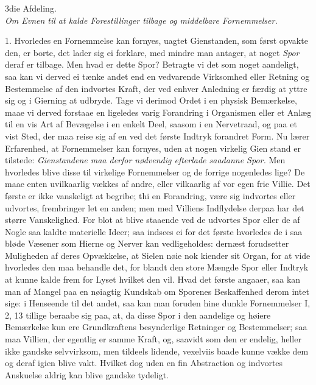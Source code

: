 \documentclass[12pt,a4paper]{article}
\newcommand{\afdeling}[2]{%
  \medskip\begin{center}{\large #1}\\[4pt]{\emph{#2}}\end{center}\smallskip}
\newcommand{\opage}[1]{\marginnote{\footnotesize\textit{[#1]}}}
\begin{document}
\afdeling{3die Afdeling.}{Om Evnen til at kalde Forestillinger tilbage og middelbare
Fornemmelser.}

1. Hvorledes en Fornemmelse kan fornyes, uagtet Gienstanden, som først opvakte den, er
borte, det lader sig ei forklare, med mindre man antager, at noget \emph{Spor} deraf er
tilbage. Men hvad er dette Spor? Betragte vi det som noget aandeligt, saa kan vi derved
ei tænke andet end en vedvarende Virksomhed eller Retning og Bestemmelse af den
indvortes Kraft, der ved enhver Anledning er færdig at yttre sig og i Gierning at
udbryde. Tage vi derimod Ordet i en physisk Bemærkelse, maae vi derved forstaae en
ligeledes varig Forandring i Organismen eller et Anlæg til en vis Art af Bevægelse i en
enkelt Deel, saasom i en Nervetraad, og paa et vist Sted, der maa reise sig af en ved
det første Indtryk forandret Form. Nu lærer Erfarenhed, at Fornemmelser kan fornyes,
uden at nogen virkelig Gien%
\opage{91}stand er tilstede: \emph{Gienstandene maa derfor nødvendig efterlade saadanne Spor.} Men
hvorledes blive disse til virkelige Fornemmelser og de forrige nogenledes lige? De maae
enten uvilkaarlig vækkes af andre, eller vilkaarlig af vor egen frie Villie. Det første
er ikke vanskeligt at begribe; thi en Forandring, være sig indvortes eller udvortes,
frembringer let en anden; men med Villiens Indflydelse derpaa har det større
Vanskelighed. For blot at blive staaende ved de udvortes Spor eller de af Nogle saa
kaldte materielle Ideer; saa indsees ei for det første hvorledes de i saa bløde Væsener
som Hierne og Nerver kan vedligeholdes: dernæst forudsetter Muligheden af deres
Opvækkelse, at Sielen nøie nok kiender sit Organ, for at vide hvorledes den maa behandle
det, for blandt den store Mængde Spor eller Indtryk at kunne kalde frem for Lyset
hvilket den vil. Hvad det første angaaer, saa kan man af Mangel paa en nøiagtig Kundskab
om Sporenes Beskaffenhed derom intet sige: i Henseende til det andet, saa kan man foruden
hine dunkle Fornemmelser I, 2, 13 tillige beraabe sig paa, at, da disse Spor i den
aandelige og høiere Bemærkelse kun ere Grundkraftens besynderlige Retninger og
Bestemmelser; saa maa Villien, der egentlig er samme Kraft, og, saavidt som den er
endelig, heller ikke gandske selvvirksom, men tildeels lidende, vexelviis baade kunne
vække dem og deraf igien blive
\opage{92} vakt. Hvilket dog uden en fin Abstraction og indvortes Anskuelse aldrig kan blive
gandske tydeligt.
\end{document}
